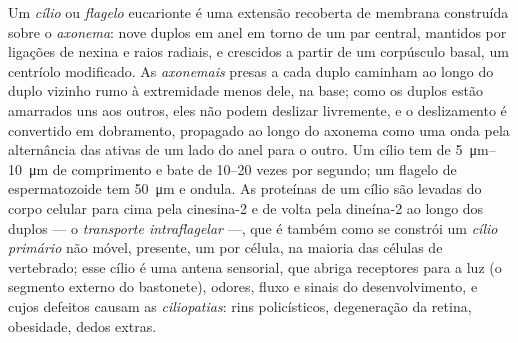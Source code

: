 \begin{definition}\label{def:b3:cytoskeleton-motility:cilia}
Um \emph{cílio} ou \emph{flagelo} eucarionte é uma extensão recoberta de
membrana construída sobre o \emph{axonema}: nove  duplos em
anel em torno de um par central, mantidos por ligações de nexina e
raios radiais, e crescidos a partir de um corpúsculo basal, um
centríolo modificado. As \emph{ axonemais} presas a cada duplo
caminham ao longo do duplo vizinho rumo à extremidade menos dele, na
base; como os duplos estão amarrados uns aos outros, eles não podem
deslizar livremente, e o deslizamento é convertido em dobramento,
propagado ao longo do axonema como uma onda pela alternância das
 ativas de um lado do anel para o outro. Um cílio tem de
\qtyrange{5}{10}{\micro m} de comprimento e bate de \numrange{10}{20}
vezes por segundo; um flagelo de espermatozoide tem \qty{50}{\micro m}
e ondula. As proteínas de um cílio são levadas do corpo celular para
cima pela cinesina-2 e de volta pela dineína-2 ao longo dos duplos ---
o \emph{transporte intraflagelar} ---, que é também como se constrói um
\emph{cílio primário} não móvel, presente, um por célula, na maioria
das células de vertebrado; esse cílio é uma antena sensorial, que
abriga receptores para a luz (o segmento externo do bastonete),
odores, fluxo e sinais do desenvolvimento, e cujos defeitos causam as
\emph{ciliopatias}: rins policísticos, degeneração da retina, obesidade,
dedos extras.
\end{definition}

